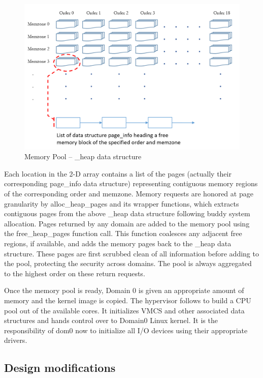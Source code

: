 \begin{figure}[h]
\centering
\includegraphics[scale=0.88]{figures/heap_data_structure.png}
\caption{Memory Pool -- \_heap data structure}
\label{fig:heap_struct}
\end{figure}

Each location in the 2-D array contains a list of the pages (actually their corresponding page\_info data structure) representing contiguous memory regions of the corresponding order and memzone. Memory requests are honored at page granularity by alloc\_heap\_pages and its wrapper functions, which extracts contiguous pages from the above \_heap data structure following buddy system allocation. Pages returned by any domain are added to the memory pool using the free\_heap\_pages function call. This function coalesces any adjacent free regions, if available, and adds the memory pages back to the \_heap data structure. These pages are first scrubbed clean of all information before adding to the pool, protecting the security across domains. The pool is always aggregated to the highest order on these return requests.

Once the memory pool is ready, Domain 0 is given an appropriate amount of memory and the kernel image is copied. The hypervisor follows to build a CPU pool out of the available cores. It initializes VMCS and other associated data structures and hands control over to Domain0 Linux kernel. It is the responsibility of dom0 now to initialize all I/O devices using their appropriate drivers. 

\subsection{Design modifications}


